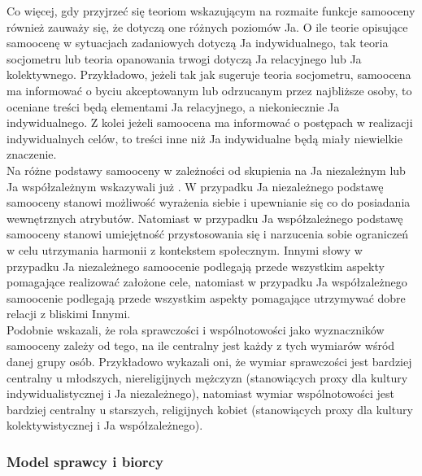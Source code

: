 \documentclass[man]{apa6}
\begin{document}
Co więcej, gdy przyjrzeć się teoriom wskazującym na rozmaite funkcje samooceny również zauważy się, że dotyczą one różnych poziomów Ja. O ile teorie opisujące samoocenę w sytuacjach zadaniowych \parencite[np., ][]{bandura1994self} dotyczą Ja indywidualnego, tak teoria socjometru \parencite{leary1995self} lub teoria opanowania trwogi \parencite{pyszczynski2004people} dotyczą Ja relacyjnego lub Ja kolektywnego. Przykładowo, jeżeli tak jak sugeruje teoria socjometru, samoocena ma informować o byciu akceptowanym lub odrzucanym przez najbliższe osoby, to oceniane treści będą elementami Ja relacyjnego, a niekoniecznie Ja indywidualnego. Z kolei jeżeli samoocena ma informować o postępach w realizacji indywidualnych celów, to treści inne niż Ja indywidualne będą miały niewielkie znaczenie.\\

Na różne podstawy samooceny w zależności od skupienia na Ja niezależnym lub Ja współzależnym wskazywali już \textcite{markus1991culture}. W przypadku Ja niezależnego podstawę samooceny stanowi możliwość wyrażenia siebie i upewnianie się co do posiadania wewnętrznych atrybutów. Natomiast w przypadku Ja współzależnego podstawę samooceny stanowi umiejętność przystosowania się i narzucenia sobie ograniczeń w celu utrzymania harmonii z kontekstem społecznym. Innymi słowy w przypadku Ja niezależnego samoocenie podlegają przede wszystkim aspekty pomagające realizować założone cele, natomiast w przypadku Ja współzależnego samoocenie podlegają przede wszystkim aspekty pomagające utrzymywać dobre relacji z bliskimi Innymi.\\

Podobnie \textcite{gebauer2013agency} wskazali, że rola sprawczości i wspólnotowości jako wyznaczników samooceny zależy od tego, na ile centralny jest każdy z tych wymiarów wśród danej grupy osób. Przykładowo wykazali oni, że wymiar sprawczości jest bardziej centralny u młodszych, niereligijnych mężczyzn (stanowiących proxy dla kultury indywidualistycznej i Ja niezależnego), natomiast wymiar wspólnotowości jest bardziej centralny u starszych, religijnych kobiet (stanowiących proxy dla kultury kolektywistycznej i Ja współzależnego).\\

\subsubsection{Model sprawcy i biorcy \parencite{wojciszke2006perspektywa}}
\end{document}
